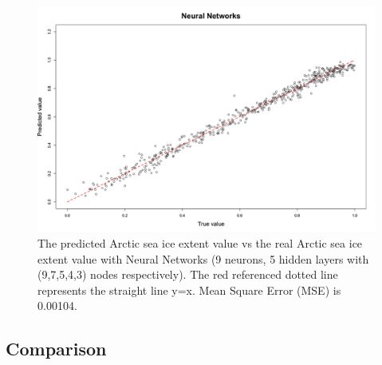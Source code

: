 \begin{figure}[htbp]
\centering
\includegraphics[width = 1.0\textwidth]{Figure/4.2.7-NN.png}
\caption{The predicted Arctic sea ice extent value vs the real Arctic sea ice extent value with Neural Networks (9 neurons, 5 hidden layers with (9,7,5,4,3) nodes respectively). The red referenced dotted line represents the straight line y=x. Mean Square Error (MSE) is 0.00104.}
\label{4.2.7-NN}
\end{figure}



\subsection{Comparison} %

